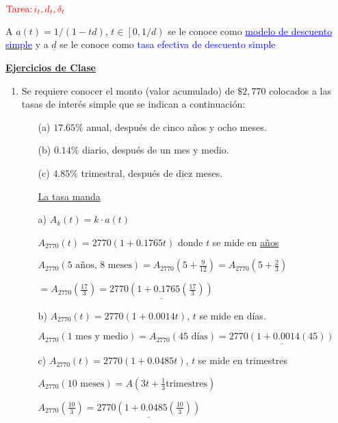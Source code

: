 $\text{\textcolor{red}{Tarea:}} \, \textcolor{red}{i_t,} \, \textcolor{red}{d_t,}   \, \textcolor{red}{\delta_t}$

A $\boxed{a(t) = 1/(1-td)}$, $t\in \left[0,1/d \right) $ se le conoce como \textcolor{blue}{\underline{modelo de descuento simple}} y a $\underline{d}$ se le conoce como \textcolor{blue}{tasa efectiva de descuento simple}

\textbf{\underline{Ejercicios de Clase}}

\begin{enumerate}
\item Se requiere conocer el monto (valor acumulado) de $\$2,770$ colocados a las tasas de interés simple que se indican a continuación:
	\begin{enumerate}
	\item[(a)] $17.65 \%$ anual, después de 		cinco años y ocho meses.
	\item[(b)] $0.14 \%$ diario, después de un 	mes y medio.
	\item[(c)] $4.85 \%$ trimestral, después 		de diez meses.
	
\hfill

\underline{\underline{La tasa manda}}

\item[ a)] $A_k(t) = k\cdot a(t)$

$A_{2770}(t) = 2770(1+0.1765t)$ donde $t$ se mide en \underline{años}

$A_{2770}(\text{5 años, 8 meses}) = A_{2770}\left(5+\frac{9}{12} \right)=A_{2770}\left( 5 + \frac{2}{3}\right) $

$= A_{2770}\left( \frac{17}{3}\right)  = \underline{2770 \left( 1+0.1765\left( \frac{17}{3}\right) \right)} $

\hfill

\item[b)] $A_{2770}(t) = 2770(1+0.0014t)$, $t$ se mide en días.

$A_{2770} (\text{1 mes y medio}) = A_{2770}(\text{45 días}) = \underline{2770(1+0.0014(45))}$

\hfill

\item[c)] $A_{2770}(t)=2770(1+0.0485t)$, $t$ se mide en trimestres

$A_{2770}(\text{10 meses}) = A\left(3t +\frac{1}{3} \text{trimestres}\right) $ 

$A_{2770}\left(\frac{10}{3} \right)  = \underline{2770\left( 1+0.0485\left(\frac{10}{3} \right) \right)} $ 

	\end{enumerate}
\end{enumerate}




